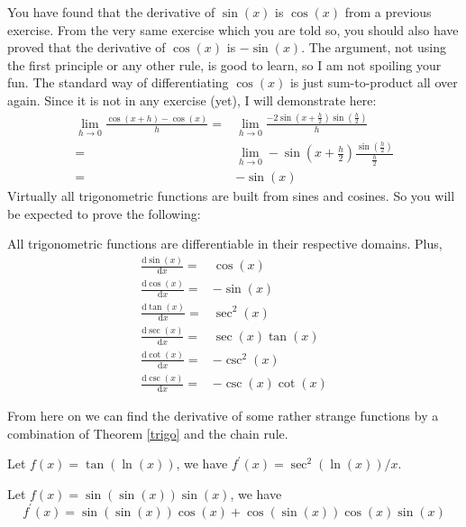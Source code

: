 You have found that the derivative of $\sin(x)$ is $\cos(x)$ from a previous exercise.
From the very same exercise which you are told so, you should also have proved that the derivative of $\cos(x)$ is $-\sin(x)$.
The argument, not using the first principle or any other rule, is good to learn, so I am not spoiling your fun.
The standard way of differentiating $\cos(x)$ is just sum-to-product all over again.
Since it is not in any exercise (yet), I will demonstrate here:
\begin{align*}
    \lim_{h\to0}\frac{\cos(x+h)-\cos(x)}{h}=&
    \lim_{h\to0}\frac{-2\sin(x+\frac{h}{2})\sin(\frac{h}{2})}{h}\\
    =&\lim_{h\to0}-\sin(x+\frac{h}{2})\frac{\sin(\frac{h}{2})}{\frac{h}{2}}\\
    =&-\sin(x)
\end{align*}
Virtually all trigonometric functions are built from sines and cosines.
So you will be expected to prove the following:
\begin{theorem}
    All trigonometric functions are differentiable in their respective domains.
    Plus,
    \begin{align}
        \frac{\mathrm d\sin(x)}{\mathrm dx}=&\cos(x)\\
        \frac{\mathrm d\cos(x)}{\mathrm dx}=&-\sin(x)\\
        \frac{\mathrm d\tan(x)}{\mathrm dx}=&\sec^2(x)\\
        \frac{\mathrm d\sec(x)}{\mathrm dx}=&\sec(x)\tan(x)\\
        \frac{\mathrm d\cot(x)}{\mathrm dx}=&-\csc^2(x)\\
        \frac{\mathrm d\csc(x)}{\mathrm dx}=&-\csc(x)\cot(x)
    \end{align}
    \label{trigo}
\end{theorem}
From here on we can find the derivative of some rather strange functions by a combination of Theorem \ref{trigo} and the chain rule.
\begin{example}
    Let $f(x)=\tan(\ln(x))$, we have $f^\prime(x)=\sec^2(\ln(x))/x$.
\end{example}
\begin{example}
    Let $f(x)=\sin(\sin(x))\sin(x)$, we have
    $$f^\prime(x)=\sin(\sin(x))\cos(x)+\cos(\sin(x))\cos(x)\sin(x)$$
\end{example}